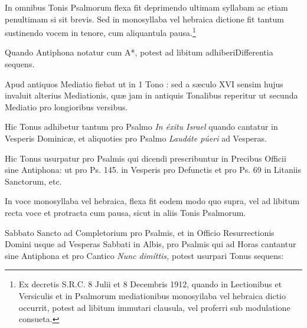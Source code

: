 \documentclass[vesperale_romanum.tex]{subfiles}
\begin{document}


In omnibus Tonis Psalmorum flexa fit deprimendo ultimam syllabam ac etiam penultimam si sit brevis. Sed in monosyllaba vel hebraica dictione fit tantum sustinendo vocem in tenore, cum aliquantula pausa.\footnote{Ex decretis S.R.C. 8 Julii et 8 Decembris 1912, quando in Lectionibus et Versiculis et in Psalmorum mediationibus monosyilaba vel hebraica dictio occurrit, potest ad libitum immutari clausula, vel proferri sub modulatione consueta.}



Quando Antiphona notatur cum A*, potest ad libitum adhiberiDifferentia sequens.


Apud antiquos Mediatio fiebat ut in 1 Tono : sed a sæculo XVI sensim hujus invaluit alterius Mediationis, quæ jam in antiquis Tonalibus reperitur ut secunda Mediatio pro longioribus versibus.


Hic Tonus adhibetur tantum pro Psalmo \textit{In éxitu Israel} quando cantatur in Vesperis Dominicæ, et aliquoties pro Psalmo \textit{Laudáte púeri} ad Vesperas.




Hic Tonus usurpatur pro Psalmis qui dicendi prescribuntur in Precibus Officii sine Antiphona: ut pro Ps. 145. in Vesperis pro Defunctis et pro Ps. 69 in Litaniis Sanctorum, etc.


In voce monosyllaba vel hebraica, flexa fit eodem modo quo supra, vel ad libitum recta voce et protracta cum pausa, sicut in aliis Tonis Psalmorum.

Sabbato Sancto ad Completorium pro Psalmis, et in Officio Resurrectionis Domini usque ad Vesperas Sabbati in Albis, pro Psalmis qui ad Horas cantantur sine Antiphona et pro Cantico \textit{Nunc dimíttis,} potest usurpari Tonus sequens:
\end{document}
